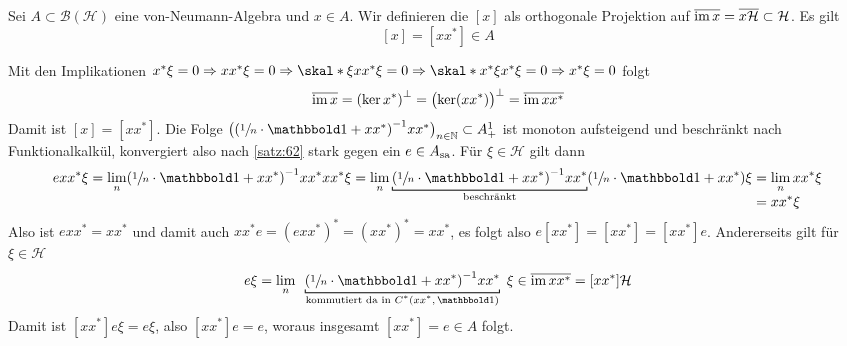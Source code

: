 \begin{definitionP}[label=def:610,{name=[Bildprojektion]}]
	Sei $A \subset \mathcal{B}(\mathcal{H})$ eine von-Neumann-Algebra und $x \in A$.
	Wir definieren die  $[x]$ als orthogonale Projektion auf $\overline{\im x} = \overline{x \mathcal{H}} \subset \mathcal{H}$. 
	Es gilt
	\[
		[x] = [xx^*] \in A
	\]
\end{definitionP}
\begin{beweis}
	Mit den Implikationen $x^* \xi=0 \Rightarrow xx^* \xi=0 \Rightarrow \skal*{\xi}{xx^*\xi}=0 \Rightarrow \skal*{x^* \xi}{x^*\xi}=0 \Rightarrow x^* \xi=0$ folgt
	\[
		\overline{\im x} = \enbrace*{\ker x^*}^\bot = \enbrace[\big]{\ker (xx^*)}^\bot = \overline{\im xx^*}
	\]
	Damit ist $[x]=[xx^*]$. 
	Die Folge $\enbrace[\big]{\enbrace*{\sfrac{1}{n} \cdot \ind + xx^*}^{-1} xx^*}_{n \in \mathbb{N}} \subset A_+^1$ ist monoton aufsteigend und beschränkt nach Funktionalkalkül, konvergiert also nach \autoref{satz:62} stark gegen ein $e \in A_\sa$.
	Für $\xi \in \mathcal{H}$ gilt dann
	\begin{align}
		e xx^* \xi = \lim_n \enbrace*{\sfrac{1}{n} \cdot \ind + xx^*}^{-1} xx^* xx^* \xi = \lim_n \Underbracket{\enbrace*{\sfrac{1}{n} \cdot \ind + xx^*}^{-1} xx^*}{\text{beschränkt} } \enbrace*{\sfrac{1}{n} \cdot \ind + xx^*} \xi 
		&= \lim_n xx^* \xi \\[-.8em] &= xx^* \xi
	\end{align}
	Also ist $exx^* = xx^*$ und damit auch $xx^*e=(e xx^*)^* = (xx^*)^* = xx^*$, es folgt also $e[xx^*] = [xx^*] = [xx^*]e$.
	Andererseits gilt für $\xi \in \mathcal{H}$
	\begin{align}
		e \xi = \lim_n \enspace\Underbracket{\enbrace*{\sfrac{1}{n} \cdot \ind + xx^*}^{-1} xx^*}{\mathclap{\text{kommutiert da in $C^*(xx^*,\ind)$}}}\enspace \xi \in \overline{\im xx^*}= [xx^*] \mathcal{H}
	\end{align}
	Damit ist $[xx^*]e \xi = e \xi$, also $[xx^*]e=e$, woraus insgesamt $[xx^*]=e \in A$ folgt.
\end{beweis}

